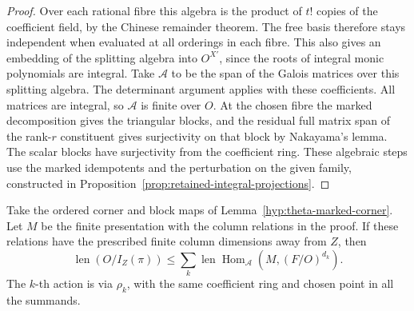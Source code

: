 \begin{proof}
Over each rational fibre this algebra is the
product of \(t!\) copies of the coefficient field,
by the Chinese remainder theorem. The free basis
therefore stays independent when evaluated at all
orderings in each fibre. This also gives an embedding
of the splitting algebra into \(O^{X'}\), since the
roots of integral monic polynomials are integral.
Take \(\mathcal A\) to be the span of the Galois
matrices over this splitting algebra. The determinant
argument applies with these coefficients. All
matrices are integral, so \(\mathcal A\) is finite
over \(O\). At the chosen fibre the marked
decomposition gives the triangular blocks, and
the residual full matrix span of the rank-\(r\)
constituent gives surjectivity on that block by
Nakayama's lemma. The scalar blocks have surjectivity
from the coefficient ring. These algebraic steps
use the marked idempotents and the perturbation
on the given family, constructed in Proposition~\ref{prop:retained-integral-projections}.
\end{proof}

\begin{proposition}
\label{prop:theta-determinant-length}
Take the ordered corner and block maps of Lemma~\ref{hyp:theta-marked-corner}. Let \(M\) be the finite
presentation with the column relations in the proof. If these
relations have the prescribed finite column dimensions away from
\(Z\), then
\[
 \operatorname{len}(O/I_Z(\pi))\le
       \sum_k\operatorname{len}\operatorname{Hom}_{\mathcal A}
                          (M,(F/O)^{d_k}).
\]
The \(k\)-th action is via \(\rho_k\), with the same coefficient
ring and chosen point in all the summands.
\end{proposition}


